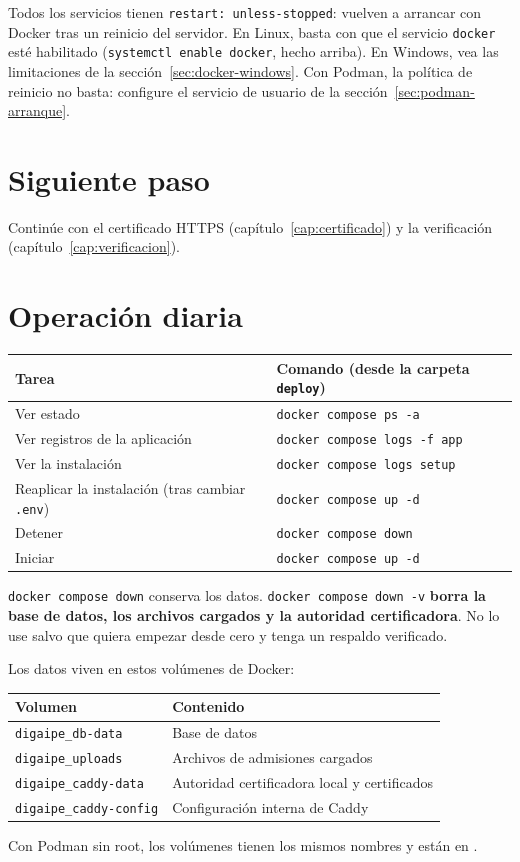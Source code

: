 Todos los servicios tienen \texttt{restart: unless-stopped}: vuelven a arrancar con Docker tras
un reinicio del servidor. En Linux, basta con que el servicio \texttt{docker} esté habilitado
(\texttt{systemctl enable docker}, hecho arriba). En Windows, vea las limitaciones de la
sección~\ref{sec:docker-windows}. Con Podman, la política de reinicio no basta: configure el
servicio de usuario de la sección~\ref{sec:podman-arranque}.

\section{Siguiente paso}

Continúe con el certificado HTTPS (capítulo~\ref{cap:certificado}) y la verificación
(capítulo~\ref{cap:verificacion}).

\section{Operación diaria}

\begin{xltabular}{\linewidth}{@{}l L@{}}
	\toprule
	\textbf{Tarea} & \textbf{Comando (desde la carpeta \texttt{deploy})} \\
	\midrule
	\endhead
	Ver estado & \texttt{docker compose ps -a} \\
	Ver registros de la aplicación & \texttt{docker compose logs -f app} \\
	Ver la instalación & \texttt{docker compose logs setup} \\
	Reaplicar la instalación (tras cambiar \texttt{.env}) & \texttt{docker compose up -d} \\
	Detener & \texttt{docker compose down} \\
	Iniciar & \texttt{docker compose up -d} \\
	\bottomrule
\end{xltabular}

\begin{aviso}
	\texttt{docker compose down} conserva los datos. \texttt{docker compose down -v}
	\textbf{borra la base de datos, los archivos cargados y la autoridad certificadora}. No lo
	use salvo que quiera empezar desde cero y tenga un respaldo verificado.
\end{aviso}

Los datos viven en estos volúmenes de Docker:

\begin{xltabular}{\linewidth}{@{}l L@{}}
	\toprule
	\textbf{Volumen} & \textbf{Contenido} \\
	\midrule
	\endhead
	\texttt{digaipe\_db-data} & Base de datos \\
	\texttt{digaipe\_uploads} & Archivos de admisiones cargados \\
	\texttt{digaipe\_caddy-data} & Autoridad certificadora local y certificados \\
	\texttt{digaipe\_caddy-config} & Configuración interna de Caddy \\
	\bottomrule
\end{xltabular}

Con Podman sin root, los volúmenes tienen los mismos nombres y están en
.
